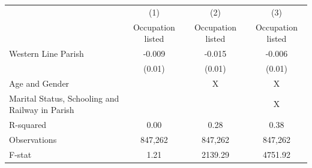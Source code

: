 {
\def\sym#1{\ifmmode^{#1}\else\(^{#1}\)\fi}
\begin{tabular}{l*{3}{c}}
\hline\hline
                    &\multicolumn{1}{c}{(1)}&\multicolumn{1}{c}{(2)}&\multicolumn{1}{c}{(3)}\\
                    &\multicolumn{1}{c}{Occupation listed}&\multicolumn{1}{c}{Occupation listed}&\multicolumn{1}{c}{Occupation listed}\\
\hline
Western Line Parish &      -0.009         &      -0.015         &      -0.006         \\
                    &      (0.01)         &      (0.01)         &      (0.01)         \\
\hline
Age and Gender      &                     &           X         &           X         \\
Marital Status, Schooling and Railway in Parish&                     &                     &           X         \\
R-squared           &        0.00         &        0.28         &        0.38         \\
Observations        &     847,262         &     847,262         &     847,262         \\
F-stat              &        1.21         &     2139.29         &     4751.92         \\
\hline\hline
\end{tabular}
}
